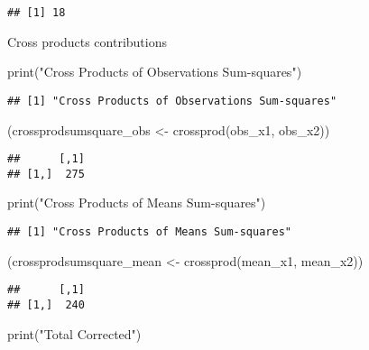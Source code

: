 \documentclass[
]{article}
\newenvironment{Shaded}{\begin{snugshade}}{\end{snugshade}}
\newcommand{\FunctionTok}[1]{\textcolor[rgb]{0.00,0.00,0.00}{#1}}
\newcommand{\NormalTok}[1]{#1}
\newcommand{\OtherTok}[1]{\textcolor[rgb]{0.56,0.35,0.01}{#1}}
\newcommand{\StringTok}[1]{\textcolor[rgb]{0.31,0.60,0.02}{#1}}
\begin{document}
\begin{verbatim}
## [1] 18
\end{verbatim}

Cross products contributions

\begin{Shaded}
\begin{Highlighting}[]
\FunctionTok{print}\NormalTok{(}\StringTok{"Cross Products of Observations Sum{-}squares"}\NormalTok{)}
\end{Highlighting}
\end{Shaded}

\begin{verbatim}
## [1] "Cross Products of Observations Sum-squares"
\end{verbatim}

\begin{Shaded}
\begin{Highlighting}[]
\NormalTok{(crossprodsumsquare\_obs }\OtherTok{\textless{}{-}} \FunctionTok{crossprod}\NormalTok{(obs\_x1, obs\_x2))}
\end{Highlighting}
\end{Shaded}

\begin{verbatim}
##      [,1]
## [1,]  275
\end{verbatim}

\begin{Shaded}
\begin{Highlighting}[]
\FunctionTok{print}\NormalTok{(}\StringTok{"Cross Products of Means Sum{-}squares"}\NormalTok{)}
\end{Highlighting}
\end{Shaded}

\begin{verbatim}
## [1] "Cross Products of Means Sum-squares"
\end{verbatim}

\begin{Shaded}
\begin{Highlighting}[]
\NormalTok{(crossprodsumsquare\_mean }\OtherTok{\textless{}{-}} \FunctionTok{crossprod}\NormalTok{(mean\_x1, mean\_x2))}
\end{Highlighting}
\end{Shaded}

\begin{verbatim}
##      [,1]
## [1,]  240
\end{verbatim}

\begin{Shaded}
\begin{Highlighting}[]
\FunctionTok{print}\NormalTok{(}\StringTok{"Total Corrected"}\NormalTok{)}
\end{Highlighting}
\end{Shaded}
\end{document}
